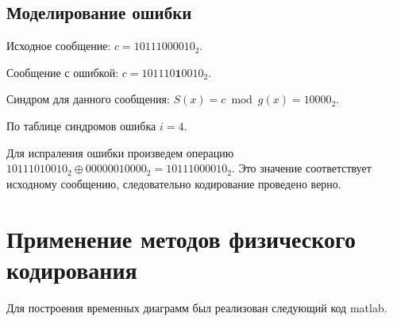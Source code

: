 \documentclass[a4paper, 14pt]{article}
\begin{document}
\subsection{Моделирование ошибки}

Исходное сообщение: $c = 10111000010_2 $.

Сообщение с ошибкой: $c = 101110\mathbf{1}0010_2 $.

Синдром для данного сообщения: $S(x) = c \bmod g(x) = 10000_2$.

По таблице синдромов ошибка $i = 4$.

Для испраления ошибки произведем операцию $10111010010_2 \oplus 00000010000_2 = 10111000010_2$. Это значение соответствует исходному сообщению, следовательно кодирование проведено верно.

\section{Применение методов физического кодирования}

Для построения временных диаграмм был реализован следующий код matlab.
\end{document}
